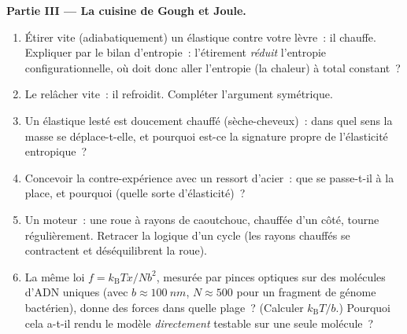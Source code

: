 \begin{problem}
\medskip\noindent\textbf{Partie III --- La cuisine de Gough et Joule.}
\begin{enumerate}[resume]
  \item Étirer vite (adiabatiquement) un élastique contre votre
        lèvre~: il chauffe. Expliquer par le bilan d'entropie~:
        l'étirement \emph{réduit} l'entropie configurationnelle, où
        doit donc aller l'entropie (la chaleur) à total constant~?
  \item Le relâcher vite~: il refroidit. Compléter l'argument
        symétrique.
  \item Un élastique lesté est doucement chauffé (sèche-cheveux)~:
        dans quel sens la masse se déplace-t-elle, et pourquoi est-ce
        la signature propre de l'élasticité entropique~?
  \item Concevoir la contre-expérience avec un ressort d'acier~: que se
        passe-t-il à la place, et pourquoi (quelle sorte
        d'élasticité)~?
  \item Un moteur~: une roue à rayons de caoutchouc, chauffée d'un
        côté, tourne régulièrement. Retracer la logique d'un cycle
        (les rayons chauffés se contractent et déséquilibrent la
        roue).
  \item La même loi $f = k_{\text{B}}Tx/Nb^2$, mesurée par pinces
        optiques sur des molécules d'ADN uniques (avec $b \approx
        \qty{100}{nm}$, $N \approx 500$ pour un fragment de génome
        bactérien), donne des forces dans quelle plage~? (Calculer
        $k_{\text{B}}T/b$.) Pourquoi cela a-t-il rendu le modèle
        \emph{directement} testable sur une seule molécule~?
\end{enumerate}


\end{problem}
